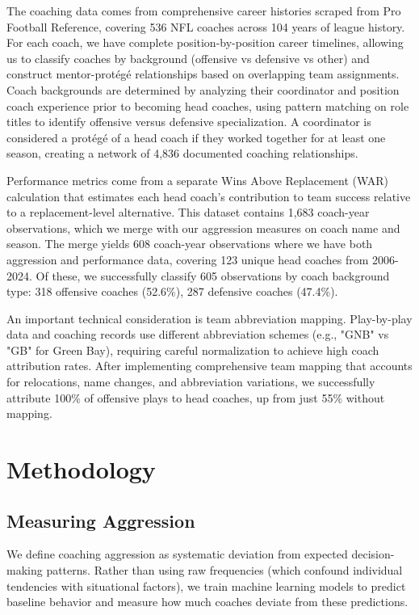 \documentclass[11pt,twocolumn]{article}
\begin{document}
The coaching data comes from comprehensive career histories scraped from Pro Football Reference, covering 536 NFL coaches across 104 years of league history. For each coach, we have complete position-by-position career timelines, allowing us to classify coaches by background (offensive vs defensive vs other) and construct mentor-protégé relationships based on overlapping team assignments. Coach backgrounds are determined by analyzing their coordinator and position coach experience prior to becoming head coaches, using pattern matching on role titles to identify offensive versus defensive specialization. A coordinator is considered a protégé of a head coach if they worked together for at least one season, creating a network of 4,836 documented coaching relationships.

Performance metrics come from a separate Wins Above Replacement (WAR) calculation that estimates each head coach's contribution to team success relative to a replacement-level alternative. This dataset contains 1,683 coach-year observations, which we merge with our aggression measures on coach name and season. The merge yields 608 coach-year observations where we have both aggression and performance data, covering 123 unique head coaches from 2006-2024. Of these, we successfully classify 605 observations by coach background type: 318 offensive coaches (52.6\%), 287 defensive coaches (47.4\%).

An important technical consideration is team abbreviation mapping. Play-by-play data and coaching records use different abbreviation schemes (e.g., "GNB" vs "GB" for Green Bay), requiring careful normalization to achieve high coach attribution rates. After implementing comprehensive team mapping that accounts for relocations, name changes, and abbreviation variations, we successfully attribute 100\% of offensive plays to head coaches, up from just 55\% without mapping.

\section{Methodology}

\subsection{Measuring Aggression}

We define coaching aggression as systematic deviation from expected decision-making patterns. Rather than using raw frequencies (which confound individual tendencies with situational factors), we train machine learning models to predict baseline behavior and measure how much coaches deviate from these predictions.
\end{document}

